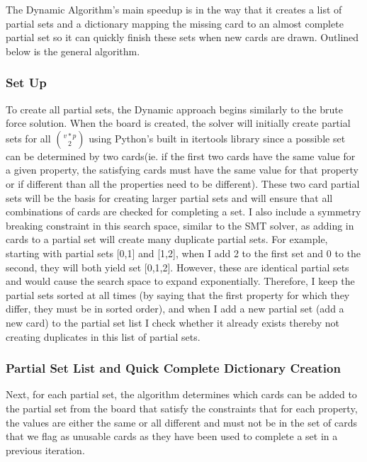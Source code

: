 \documentclass[pageno]{jpaper}
\begin{document}
The Dynamic Algorithm's main speedup is in the way that it creates a list of partial sets and a dictionary mapping the missing card to an almost complete partial set so it can quickly finish these sets when new cards are drawn. Outlined below is the general algorithm. 

\subsubsection{Set Up}

To create all partial sets, the Dynamic approach begins similarly to the brute force solution. When the board is created, the solver will initially create partial sets for all ${v*p}\choose{2}$ using Python's built in itertools library since a possible set can be  determined by two cards(ie. if the first two cards have the same value for a given property, the satisfying cards must have the same value for that property or if different than all the properties need to be different). These two card partial sets will be the basis for creating larger partial sets and will ensure that all combinations of cards are checked for completing a set. I also include a symmetry breaking constraint in this search space, similar to the SMT solver, as adding in cards to a partial set will create many duplicate partial sets. For example, starting with partial sets [0,1] and [1,2], when I add 2 to the first set and 0 to the second, they will both yield set [0,1,2]. However, these are identical partial sets and would cause the search space to expand exponentially.  Therefore, I keep the partial sets sorted at all times (by saying that the first property for which they differ, they must be in sorted order), and when I add a new partial set (add a new card) to the partial set list I check whether it already exists thereby not creating duplicates in this list of partial sets.

\subsubsection{Partial Set List and Quick Complete Dictionary Creation}

Next, for each partial set, the algorithm determines which cards can be added to the partial set from the board that satisfy the constraints that for each property, the values are either the same or all different and must not be in the set of cards that we flag as unusable cards as they have been used to complete a set in a previous iteration. 
\end{document}
